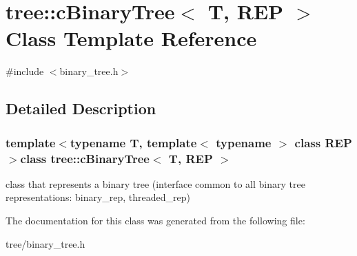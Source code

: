 \hypertarget{classtree_1_1cBinaryTree}{\section{tree\-:\-:c\-Binary\-Tree$<$ \-T, \-R\-E\-P $>$ \-Class \-Template \-Reference}
\label{classtree_1_1cBinaryTree}
}


{\ttfamily \#include $<$binary\-\_\-tree.\-h$>$}



\subsection{\-Detailed \-Description}
\subsubsection*{template$<$typename T, template$<$ typename $>$ class \-R\-E\-P$>$class tree\-::c\-Binary\-Tree$<$ T, R\-E\-P $>$}

class that represents a binary tree (interface common to all binary tree representations\-: binary\-\_\-rep, threaded\-\_\-rep) 

\-The documentation for this class was generated from the following file\-:\begin{DoxyCompactItemize}
\item 
tree/binary\-\_\-tree.\-h\end{DoxyCompactItemize}
